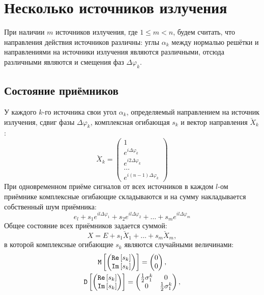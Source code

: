 \section{Несколько источников излучения}

При наличии $m$ источников излучения, где $1 \le m < n$, будем считать, что направления действия источников различны: углы $\alpha_k$ между нормалью решётки и направлениями
на источники излучения являются различными, отсюда различными являются и смещения фаз $\Delta \varphi_k$.

\subsection{Состояние приёмников}

У каждого $k$-го источника свои угол $\alpha_k$, определяемый направлением на источник излучения, сдвиг фазы $\Delta \varphi_k$, комплексная огибающая $s_k$ и
вектор направления $\breve{X}_k$:
\[
    \breve{X}_k =
    \begin{pmatrix}
        1                        \\
        e^{i \Delta \varphi_k}   \\
        e^{i 2 \Delta \varphi_k} \\
        \dots                    \\
        e^{i (n-1) \Delta \varphi_k}
    \end{pmatrix}
\]
При одновременном приёме сигналов от всех источников в каждом $l$-ом приёмнике комплексные огибающие складываются и на сумму накладывается собственный шум приёмника:
\[
    e_l + s_1 e^{i l \Delta \varphi_1} + s_2 e^{i l \Delta \varphi_2} + \dots + s_m e^{i l \Delta \varphi_m}
\]
Общее состояние всех приёмников задается суммой:
\[
    X = E + s_1 \breve{X}_1 + \dots + s_m \breve{X}_m ,
\]
в которой комплексные огибающие $s_k$ являются случайными величинами:
\begin{gather*}
    \mathtt{M} \left [ 
        \begin{pmatrix}
            \mathtt{Re} \left [ s_k \right ] \\ \mathtt{Im} \left [ s_k \right ]
        \end{pmatrix}
     \right ] =
    \begin{pmatrix}
        0 \\
        0
    \end{pmatrix} , \\
    \mathtt{D} \left [ 
        \begin{pmatrix}
            \mathtt{Re} \left [ s_k \right ] \\ \mathtt{Im} \left [ s_k \right ]
        \end{pmatrix}
     \right ] =
    \begin{pmatrix}
        \frac{1}{2} \sigma_1^k & 0                      \\
        0                      & \frac{1}{2} \sigma_1^k
    \end{pmatrix} ,
\end{gather*}
